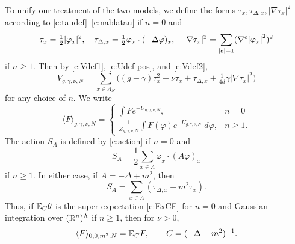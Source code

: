 To unify our treatment of the two models,
we define the forms $\tau_x, \tau_{\Delta,x}, |\nabla\tau_x|^2$ according
to \eqref{e:taudef}--\eqref{e:nablatau} if $n = 0$ and
\begin{equation}
\label{e:tauphi}
\tau_x = \tfrac{1}{2} |\varphi_x|^2,
	\quad
\tau_{\Delta,x} = \tfrac{1}{2} \varphi_x \cdot (-\Delta \varphi)_x,
	\quad
|\nabla\tau_x|^2 = \sum_{|e|=1} (\nabla^e {|\varphi_x|}^2)^2
\end{equation}
if $n \ge 1$.
Then by \eqref{e:Vdef1}, \eqref{e:Udef-pos}, and \eqref{e:Vdef2},
\begin{equation}
V_{g,\gamma,\nu,N}
	=
\sum_{x\in\Lambda_N}
\Big(
	(g - \gamma) \tau_x^2 + \nu \tau_x + \tau_{\Delta,x} + \tfrac{1}{4 d} \gamma |\nabla\tau_x|^2
\Big)
\end{equation}
for any choice of $n$.
We write
\begin{equation}
\langle F \rangle_{g,\gamma,\nu,N}
	=
\begin{cases}
\displaystyle \int F e^{-U_{g,\gamma,\nu,N}},				& n = 0 \\
\displaystyle \frac{1}{Z_{g,\gamma,\nu,N}}
	\int F(\varphi) e^{-U_{g,\gamma,\nu,N}} \; d\varphi,	& n \ge 1.
\end{cases}
\end{equation}
The action $S_A$ is defined by \eqref{e:action} if $n = 0$ and
\begin{equation}
S_A = \frac12 \sum_{x\in\Lambda} \varphi_x \cdot (A \varphi)_x
\end{equation}
if $n \ge 1$. In either case, if $A = -\Delta + m^2$, then
\begin{equation}
\label{e:SAtauDelta}
S_A = \sum_{x\in\Lambda} (\tau_{\Delta,x} + m^2 \tau_x).
\end{equation}
Thus, if $\mathbb{E}_C \theta$ is the super-expectation \eqref{e:ExCF} for $n = 0$
and Gaussian integration over $({\mathbb R}^n)^\Lambda$ if $n \ge 1$,
then for $\nu > 0$,
\begin{equation}
\label{e:phi4-gauss}
\langle F \rangle_{0,0,m^2,N}
	=
\mathbb{E}_C F,
	\qquad
C = (-\Delta + m^2)^{-1}.
\end{equation}

